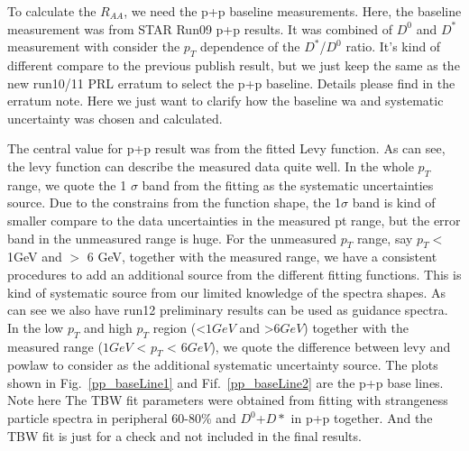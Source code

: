 To calculate the $R_{AA}$, we need the p+p baseline measurements. Here, the baseline measurement was from STAR Run09 p+p results. It was combined of $D^0$ and $D^{*}$ measurement with consider the $p_T$ dependence of the $D^*$/$D^0$ ratio. It's kind of different compare to the previous publish result, but we just keep the same as the new run10/11 PRL erratum to select the p+p baseline. Details please find in the erratum note. Here we just want to clarify how the baseline wa and systematic uncertainty was chosen and calculated.


The central value for p+p result was from the fitted Levy function. As can see, the levy function can describe the measured data quite well. In the whole $p_T$ range, we quote the 1 $\sigma$ band from the fitting as the systematic uncertainties source. Due to the constrains from the function shape, the 1$\sigma$ band is kind of smaller compare to the data uncertainties in the measured pt range, but the error band in the unmeasured range is huge. For the unmeasured $p_T$ range, say $p_T <$ 1GeV and $>$ 6 GeV, together with the measured range, we have a consistent procedures to add an additional source from the different fitting functions. This is kind of systematic source from our limited knowledge of the spectra shapes. As can see we also have run12 preliminary results can be used as guidance spectra. In the low $p_T$ and high $p_T$ region (<$1 GeV$ and >$6 GeV$) together with the measured range ($ 1GeV$ < $p_{T}$ < $6 GeV$), we quote the difference between levy and powlaw to consider as the additional systematic uncertainty source. The plots shown in Fig.~\ref{pp_baseLine1} and Fif.~\ref{pp_baseLine2} are the p+p base lines. Note here The TBW fit parameters were obtained from fitting with strangeness particle spectra in peripheral 60-80\% and $D^0$+$D*$ in p+p together. And the TBW fit is just for a check and not included in the final results.

